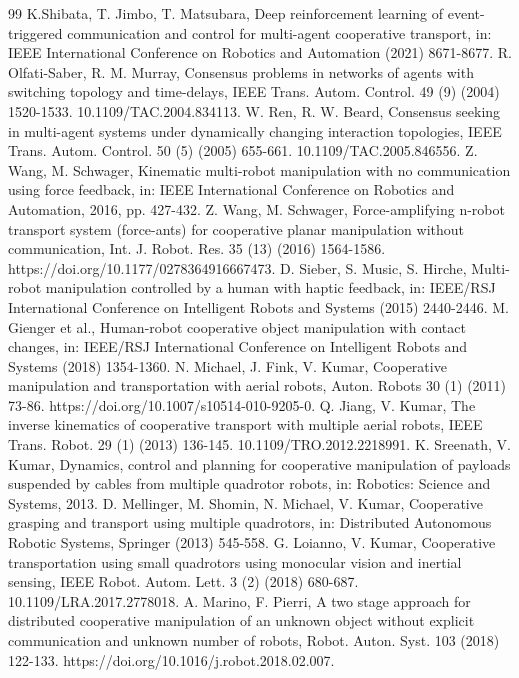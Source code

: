 \documentclass[letterpaper, 10 pt, conference]{ieeeconf} %
\begin{document}
\begin{thebibliography}{99}
 K.Shibata, T. Jimbo, T. Matsubara, Deep reinforcement learning of event-triggered communication and control for multi-agent cooperative transport, in: IEEE International Conference on Robotics and Automation (2021) 8671-8677.
 R. Olfati-Saber, R. M. Murray, Consensus problems in networks of agents with switching topology and time-delays, IEEE Trans. Autom. Control. 49 (9) (2004) 1520-1533. 10.1109/TAC.2004.834113.
 W. Ren, R. W. Beard, Consensus seeking in multi-agent systems under dynamically changing interaction topologies, IEEE Trans. Autom. Control. 50 (5) (2005) 655-661. 10.1109/TAC.2005.846556.
 Z. Wang, M. Schwager, Kinematic multi-robot manipulation with no communication using force feedback, in: IEEE International Conference on Robotics and Automation, 2016, pp. 427-432.
 Z. Wang, M. Schwager, Force-amplifying n-robot transport system (force-ants) for cooperative planar manipulation without communication, Int. J. Robot. Res. 35 (13) (2016) 1564-1586. https://doi.org/10.1177/0278364916667473.
 D. Sieber, S. Music, S. Hirche, Multi-robot manipulation controlled by a human with haptic feedback, in: IEEE/RSJ International Conference on Intelligent Robots and Systems (2015) 2440-2446.
 M. Gienger et al., Human-robot cooperative object manipulation with contact changes, in: IEEE/RSJ International Conference on Intelligent Robots and Systems (2018) 1354-1360.
 N. Michael, J. Fink, V. Kumar, Cooperative manipulation and transportation with aerial robots, Auton. Robots 30 (1) (2011) 73-86. https://doi.org/10.1007/s10514-010-9205-0.
 Q. Jiang, V. Kumar, The inverse kinematics of cooperative transport with multiple aerial robots, IEEE Trans. Robot. 29 (1) (2013) 136-145. 10.1109/TRO.2012.2218991.
 K. Sreenath, V. Kumar, Dynamics, control and planning for cooperative manipulation of payloads suspended by cables from multiple quadrotor robots, in: Robotics: Science and Systems, 2013.
 D. Mellinger, M. Shomin, N. Michael, V. Kumar, Cooperative grasping and transport using multiple quadrotors, in: Distributed Autonomous Robotic Systems, Springer (2013) 545-558.
 G. Loianno, V. Kumar, Cooperative transportation using small quadrotors using monocular vision and inertial sensing, IEEE Robot. Autom. Lett. 3 (2) (2018) 680-687. 10.1109/LRA.2017.2778018.
 A. Marino, F. Pierri, A two stage approach for distributed cooperative manipulation of an unknown object without explicit communication and unknown number of robots, Robot. Auton. Syst. 103 (2018) 122-133. https://doi.org/10.1016/j.robot.2018.02.007.

\end{thebibliography}
\end{document}
